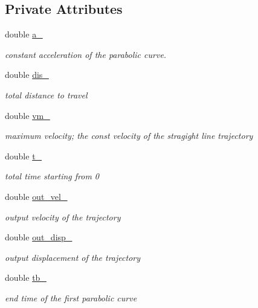 \subsection*{Private Attributes}
\begin{DoxyCompactItemize}
\item 
double \hyperlink{classnubot_1_1ParaTrajPlanning_aead29a555fdbaaa222a0d2366cdfa468}{a\-\_\-}
\begin{DoxyCompactList}\small\item\em constant acceleration of the parabolic curve. \end{DoxyCompactList}\item 
double \hyperlink{classnubot_1_1ParaTrajPlanning_ad9194b95798860fc68350949e76c1728}{dis\-\_\-}
\begin{DoxyCompactList}\small\item\em total distance to travel \end{DoxyCompactList}\item 
double \hyperlink{classnubot_1_1ParaTrajPlanning_a6e9c2b471fb2815ec3f285bdc2c8caf3}{vm\-\_\-}
\begin{DoxyCompactList}\small\item\em maximum velocity; the const velocity of the stragight line trajectory \end{DoxyCompactList}\item 
double \hyperlink{classnubot_1_1ParaTrajPlanning_af6272703f788bdb99fd53ff8d9ee1b2a}{t\-\_\-}
\begin{DoxyCompactList}\small\item\em total time starting from 0 \end{DoxyCompactList}\item 
double \hyperlink{classnubot_1_1ParaTrajPlanning_a5fccc5e03134a9d4b796561ffb93c19c}{out\-\_\-vel\-\_\-}
\begin{DoxyCompactList}\small\item\em output velocity of the trajectory \end{DoxyCompactList}\item 
double \hyperlink{classnubot_1_1ParaTrajPlanning_a7d262f02f46b3897de76310c50c082c0}{out\-\_\-disp\-\_\-}
\begin{DoxyCompactList}\small\item\em output displacement of the trajectory \end{DoxyCompactList}\item 
double \hyperlink{classnubot_1_1ParaTrajPlanning_a2b81e7bb35fc05ad45084afcfe3a3b66}{tb\-\_\-}
\begin{DoxyCompactList}\small\item\em end time of the first parabolic curve \end{DoxyCompactList}\item 

\end{DoxyCompactItemize}
